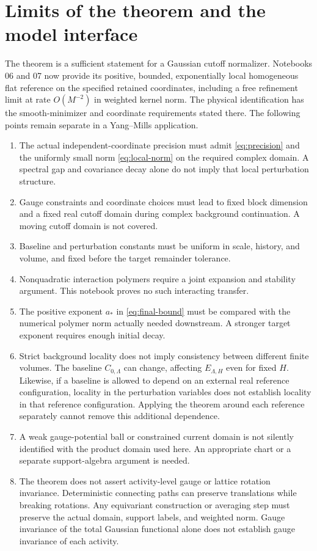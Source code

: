 \documentclass[11pt]{article}
\begin{document}
\section{Limits of the theorem and the model interface}

The theorem is a sufficient statement for a Gaussian cutoff
normalizer. Notebooks 06 and 07 now provide its positive, bounded,
exponentially local homogeneous flat reference on the specified
retained coordinates, including a free refinement limit at rate
$O(M^{-2})$ in weighted kernel norm. The physical identification has
the smooth-minimizer and coordinate requirements stated there.
The following points remain separate in a Yang--Mills application.
\begin{enumerate}
\item The actual independent-coordinate precision must admit
  \eqref{eq:precision} and the uniformly small norm
  \eqref{eq:local-norm} on the required complex domain.
  A spectral gap and covariance decay alone do not imply that
  local perturbation structure.
\item Gauge constraints and coordinate choices must lead to fixed
  block dimension and a fixed real cutoff domain during complex
  background continuation. A moving cutoff domain is not covered.
\item Baseline and perturbation constants must be uniform in scale,
  history, and volume, and fixed before the target remainder tolerance.
\item Nonquadratic interaction polymers require a joint expansion
  and stability argument. This notebook proves no such interacting
  transfer.
\item The positive exponent $a_*$ in \eqref{eq:final-bound} must be
  compared with the numerical polymer norm actually needed downstream.
  A stronger target exponent requires enough initial decay.
\item Strict background locality does not imply consistency between
  different finite volumes. The baseline $C_{0,\Lambda}$ can change,
  affecting $E_{\Lambda,H}$ even for fixed $H$.
  Likewise, if a baseline is allowed to depend on an external real
  reference configuration, locality in the perturbation variables
  does not establish locality in that reference configuration.
  Applying the theorem around each reference separately cannot remove
  this additional dependence.
\item A weak gauge-potential ball or constrained current domain is
  not silently identified with the product domain used here.
  An appropriate chart or a separate support-algebra argument is needed.
\item The theorem does not assert activity-level gauge or lattice
  rotation invariance. Deterministic connecting paths can preserve
  translations while breaking rotations. Any equivariant construction
  or averaging step must preserve the actual domain, support labels,
  and weighted norm. Gauge invariance of the total Gaussian functional
  alone does not establish gauge invariance of each activity.
\end{enumerate}
\end{document}
